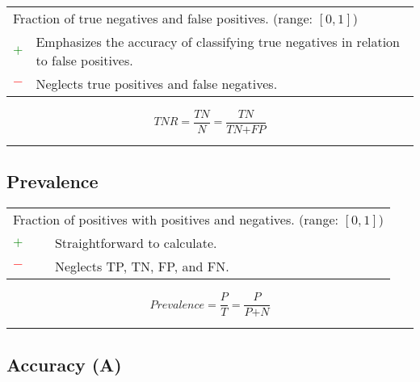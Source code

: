 \documentclass{article}
\begin{document}
\begin{table}[H]\centering
	\begin{tabular}{m{}m{}}
		\multicolumn{2}{m{0.95\textwidth}}{Fraction of true negatives and false positives. (range: $[0, 1]$)} \\
		\textcolor{Green}{$+$} & Emphasizes the accuracy of classifying true negatives in relation to false positives. \\
		\textcolor{Red}{$-$}   & Neglects true positives and false negatives.
	\end{tabular}
\end{table}

\begin{equation}
	\textit{TNR} = \dfrac{\textit{TN}}{\textit{N}} = \dfrac{\textit{TN}}{\textit{TN} + \textit{FP}}
%
	\label{equation:TNR}
\end{equation}

\hrule


\subsection[Prevalence]{Prevalence \cite{rothman2012epidemiology, bruce2018quantitative}}

\begin{table}[H]\centering
	\begin{tabular}{m{}m{}}
		\multicolumn{2}{m{0.95\textwidth}}{Fraction of positives with positives and negatives. (range: $[0, 1]$)} \\
		\textcolor{Green}{$+$} & Straightforward to calculate. \\
		\textcolor{Red}{$-$}   & Neglects TP, TN, FP, and FN.
	\end{tabular}
\end{table}

\begin{equation}
	\textit{Prevalence} = \dfrac{\textit{P}}{\textit{T}} = \dfrac{\textit{P}}{\textit{P} + \textit{N}}
%
	\label{equation:prevalence}
\end{equation}

\hrule


\subsection[Accuracy (A)]{Accuracy (A) \cite{metz1978basic, taylor1997introduction}}
\end{document}
